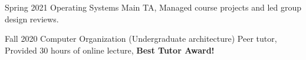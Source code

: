 

\begin{cvlist}

  \cvlistitem
    {Spring 2021 Operating Systems} %
    {Main TA, Managed course projects and led group design reviews.} %

  \cvlistitem
    {Fall 2020 Computer Organization (Undergraduate architecture)} %
    {Peer tutor, Provided 30 hours of online lecture, \textbf{Best Tutor Award!}} %

\end{cvlist}
